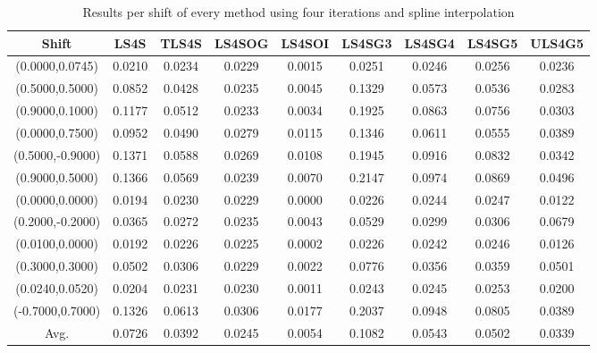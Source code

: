 \begin{table}[ht!]
\centering
\begin{tabular}{c|c|c|c|c|c|c|c|c}
Shift & \scriptsize{LS4S} & \scriptsize{TLS4S} & \scriptsize{LS4SOG} & \scriptsize{LS4SOI} & \scriptsize{LS4SG3} & \scriptsize{LS4SG4} & \scriptsize{LS4SG5} & \scriptsize{ULS4G5}\\ \hline 
(0.0000,0.0745) & 0.0210 & 0.0234 & 0.0229 & 0.0015 & 0.0251 & 0.0246 & 0.0256 & 0.0236 \\ \hline
(0.5000,0.5000) & 0.0852 & 0.0428 & 0.0235 & 0.0045 & 0.1329 & 0.0573 & 0.0536 & 0.0283 \\ \hline
(0.9000,0.1000) & 0.1177 & 0.0512 & 0.0233 & 0.0034 & 0.1925 & 0.0863 & 0.0756 & 0.0303 \\ \hline
(0.0000,0.7500) & 0.0952 & 0.0490 & 0.0279 & 0.0115 & 0.1346 & 0.0611 & 0.0555 & 0.0389 \\ \hline
(0.5000,-0.9000) & 0.1371 & 0.0588 & 0.0269 & 0.0108 & 0.1945 & 0.0916 & 0.0832 & 0.0342 \\ \hline
(0.9000,0.5000) & 0.1366 & 0.0569 & 0.0239 & 0.0070 & 0.2147 & 0.0974 & 0.0869 & 0.0496 \\ \hline
(0.0000,0.0000) & 0.0194 & 0.0230 & 0.0229 & 0.0000 & 0.0226 & 0.0244 & 0.0247 & 0.0122 \\ \hline
(0.2000,-0.2000) & 0.0365 & 0.0272 & 0.0235 & 0.0043 & 0.0529 & 0.0299 & 0.0306 & 0.0679 \\ \hline
(0.0100,0.0000) & 0.0192 & 0.0226 & 0.0225 & 0.0002 & 0.0226 & 0.0242 & 0.0246 & 0.0126 \\ \hline
(0.3000,0.3000) & 0.0502 & 0.0306 & 0.0229 & 0.0022 & 0.0776 & 0.0356 & 0.0359 & 0.0501 \\ \hline
(0.0240,0.0520) & 0.0204 & 0.0231 & 0.0230 & 0.0011 & 0.0243 & 0.0245 & 0.0253 & 0.0200 \\ \hline
(-0.7000,0.7000) & 0.1326 & 0.0613 & 0.0306 & 0.0177 & 0.2037 & 0.0948 & 0.0805 & 0.0389 \\ \hline
Avg.  & 0.0726 & 0.0392 & 0.0245 & 0.0054 & 0.1082 & 0.0543 & 0.0502 & 0.0339 \\ \hline
\end{tabular}
\caption{Results per shift of every method using four iterations and spline interpolation}
\label{tab:4itSperShift}
\end{table}



